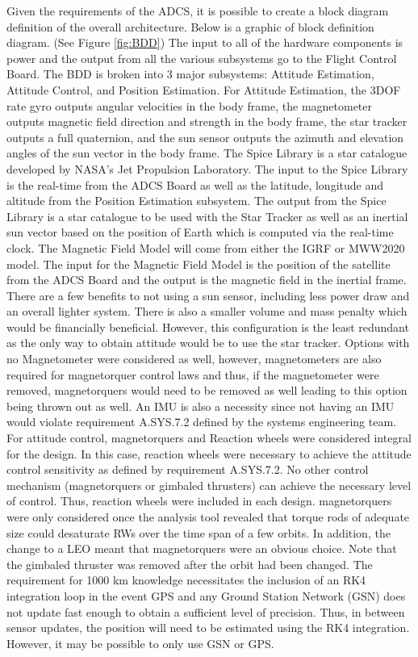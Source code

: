 \documentclass[conf]{new-aiaa}
\begin{document}
Given the requirements of the ADCS, it is possible to create a block diagram definition of the overall architecture. Below is a graphic of block definition diagram. (See Figure \ref{fig:BDD}) The input to all of the hardware components is power and the output from all the various subsystems go to the Flight Control Board. The BDD is broken into 3 major subsystems: Attitude Estimation, Attitude Control, and Position Estimation. For Attitude Estimation, the 3DOF rate gyro outputs angular velocities in the body frame, the magnetometer outputs magnetic field direction and strength in the body frame, the star tracker outputs a full quaternion, and the sun sensor outputs the azimuth and elevation angles of the sun vector in the body frame. The Spice Library is a star catalogue developed by NASA’s Jet Propulsion Laboratory. The input to the Spice Library is the real-time from the ADCS Board as well as the latitude, longitude and altitude from the Position Estimation subsystem. The output from the Spice Library is a star catalogue to be used with the Star Tracker as well as an inertial sun vector based on the position of Earth which is computed via the real-time clock. The Magnetic Field Model will come from either the IGRF or MWW2020 model. The input for the Magnetic Field Model is the position of the satellite from the ADCS Board and the output is the magnetic field in the inertial frame. There are a few benefits to not using a sun sensor, including less power draw and an overall lighter system. There is also a smaller volume and mass penalty which would be financially beneficial. However, this configuration is the least redundant as the only way to obtain attitude would be to use the star tracker. Options with no Magnetometer were considered as well, however, magnetometers are also required for magnetorquer control laws and thus, if the magnetometer were removed, magnetorquers would need to be removed as well leading to this option being thrown out as well. An IMU is also a necessity since not having an IMU would violate requirement A.SYS.7.2 defined by the systems engineering team. For attitude control, magnetorquers and Reaction wheels were considered integral for the design. In this case, reaction wheels were necessary to achieve the attitude control sensitivity as defined by requirement A.SYS.7.2. No other control mechanism (magnetorquers or gimbaled thrusters) can achieve the necessary level of control. Thus, reaction wheels were included in each design. magnetorquers were only considered once the analysis tool revealed that torque rods of adequate size could desaturate RWs over the time span of a few orbits. In addition, the change to a LEO meant that magnetorquers were an obvious choice. Note that the gimbaled thruster was removed after the orbit had been changed. The requirement for 1000 km knowledge necessitates the inclusion of an RK4 integration loop in the event GPS and any Ground Station Network (GSN) does not update fast enough to obtain a sufficient level of precision. Thus, in between sensor updates, the position will need to be estimated using the RK4 integration. However, it may be possible to only use GSN or GPS.
\end{document}
